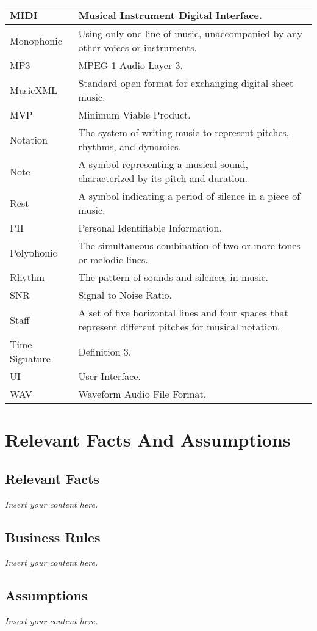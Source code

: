 \documentclass[12pt]{article}
\newcommand{\lips}{\textit{Insert your content here.}}
\begin{document}
\begin{longtable}{|l|p{12cm}|}
\hline
MIDI & Musical Instrument Digital Interface. \\ 
\hline
Monophonic & Using only one line of music, unaccompanied by any other voices or instruments. \\ 
\hline
MP3 & MPEG-1 Audio Layer 3. \\ 
\hline
MusicXML & Standard open format for exchanging digital sheet music. \\ 
\hline
MVP & Minimum Viable Product. \\ 
\hline
Notation & The system of writing music to represent pitches, rhythms, and dynamics. \\ 
\hline
Note & A symbol representing a musical sound, characterized by its pitch and duration. \\ 
\hline
Rest & A symbol indicating a period of silence in a piece of music. \\ 
\hline
PII & Personal Identifiable Information. \\ 
\hline
Polyphonic & The simultaneous combination of two or more tones or melodic lines. \\ 
\hline
Rhythm & The pattern of sounds and silences in music. \\ 
\hline
SNR & Signal to Noise Ratio. \\ 
\hline
Staff & A set of five horizontal lines and four spaces that represent different pitches for musical notation. \\ 
\hline
Time Signature & Definition 3. \\ 
\hline
UI & User Interface. \\ 
\hline
WAV & Waveform Audio File Format. \\ 
\hline

\end{longtable}

\section{Relevant Facts And Assumptions}
\subsection{Relevant Facts}
\lips
\subsection{Business Rules}
\lips
\subsection{Assumptions}
\lips
\end{document}

